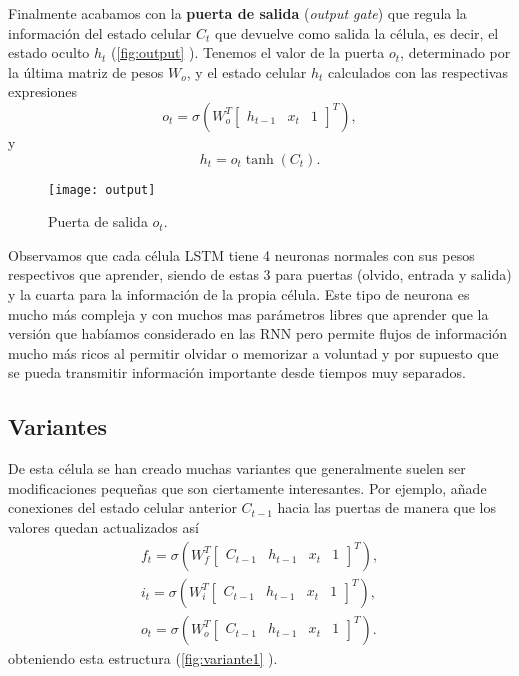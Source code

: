 Finalmente acabamos con la \textbf{puerta de salida} (\emph{output gate}) que regula la información del estado celular $C_t$ que devuelve como salida la célula, es decir, el estado oculto $h_t$ (\autoref{fig:output} \cite{christopher2015lstm}). Tenemos el valor de la puerta $o_t$, determinado por la última matriz de pesos $W_o$, y el estado celular $h_t$ calculados con las respectivas expresiones
\begin{equation*}
  o_t = \sigma\left(W_o^T \begin{bmatrix} h_{t-1} & x_t & 1 \end{bmatrix}^T\right),
  \label{eq:output1}
\end{equation*}
y
\begin{equation*}
  h_t = o_t \tanh\left(C_t\right).
  \label{eq:output2}
\end{equation*}

\begin{figure}[htpb]
  \centering
  \texttt{[image: output]}
  \caption{Puerta de salida $o_t$.}
  \label{fig:output}
\end{figure}

Observamos que cada célula LSTM tiene 4 neuronas normales con sus pesos respectivos que aprender, siendo de estas 3 para puertas (olvido, entrada y salida) y la cuarta para la información de la propia célula. Este tipo de neurona es mucho más compleja y con muchos mas parámetros libres que aprender que la versión que habíamos considerado en las RNN pero permite flujos de información mucho más ricos al permitir olvidar o memorizar a voluntad y por supuesto que se pueda transmitir información importante desde tiempos muy separados.

\subsection{Variantes}

De esta célula se han creado muchas variantes que generalmente suelen ser modificaciones pequeñas que son ciertamente interesantes. Por ejemplo, \cite{gers2000recurrent} añade conexiones del estado celular anterior $C_{t-1}$ hacia las puertas de manera que los valores quedan actualizados así
\begin{gather*}
  f_t = \sigma\left(W_f^T \begin{bmatrix} C_{t-1} & h_{t-1} & x_t & 1 \end{bmatrix}^T \right), \\
  i_t = \sigma\left(W_i^T \begin{bmatrix} C_{t-1} & h_{t-1} & x_t & 1 \end{bmatrix}^T\right), \\
  o_t = \sigma\left(W_o^T \begin{bmatrix} C_{t-1} & h_{t-1} & x_t & 1 \end{bmatrix}^T\right).
  \label{eq:variante1}
\end{gather*}
obteniendo esta estructura (\autoref{fig:variante1} \cite{christopher2015lstm}).

